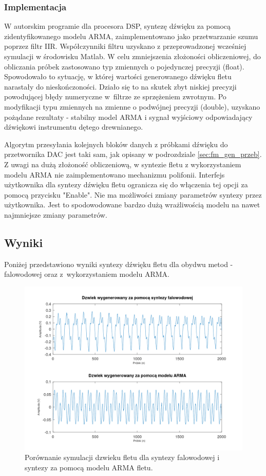 \subsubsection{Implementacja}
W autorskim programie dla procesora DSP, syntezę dźwięku za pomocą zidentyfikowanego modelu ARMA, zaimplementowano jako przetwarzanie szumu poprzez filtr IIR. Współczynniki filtru uzyskano z przeprowadzonej wcześniej symulacji w środowisku Matlab. 
W celu zmniejszenia złożoności obliczeniowej, do obliczania próbek zastosowano typ zmiennych o pojedynczej precyzji (float). Spowodowało to sytuację, w której wartości generowanego dźwięku fletu narastały do nieskończoności. Działo się to na skutek zbyt niskiej precyzji powodującej błędy numeryczne w~filtrze ze sprzężeniem zwrotnym. Po modyfikacji typu zmiennych na zmienne o podwójnej precyzji (double), uzyskano pożądane rezultaty - stabilny model ARMA i sygnał wyjściowy odpowiadający dźwiękowi instrumentu dętego drewnianego.


Algorytm przesyłania kolejnych bloków danych z próbkami dźwięku do przetwornika DAC jest taki sam, jak opisany w podrozdziale \ref{sec:fm_gen_przeb}. Z uwagi na dużą złożoność obliczeniową, w syntezie fletu z wykorzystaniem modelu ARMA nie zaimplementowano mechanizmu polifonii.
Interfejs użytkownika dla syntezy dźwięku fletu ogranicza się do włączenia tej opcji za pomocą przycisku "Enable". Nie ma możliwości zmiany parametrów syntezy przez użytkownika. Jest to spodowodowane bardzo dużą wrażliwością modelu na nawet najmniejsze zmiany parametrów.

\subsection{Wyniki}
Poniżej przedstawiono wyniki syntezy dźwięku fletu dla obydwu metod - falowodowej oraz z~wykorzystaniem modelu ARMA.

\begin{figure}[H]
	\centering
	\includegraphics[width=12cm]{grafiki/flute_porownanie_syntez_symulacja}
	\captionsetup{justification=centering}
	\caption{Porównanie symulacji dzwieku fletu dla syntezy falowodowej i syntezy za pomocą modelu ARMA fletu.}
	\label{rys:por_synt_flet}
\end{figure}

